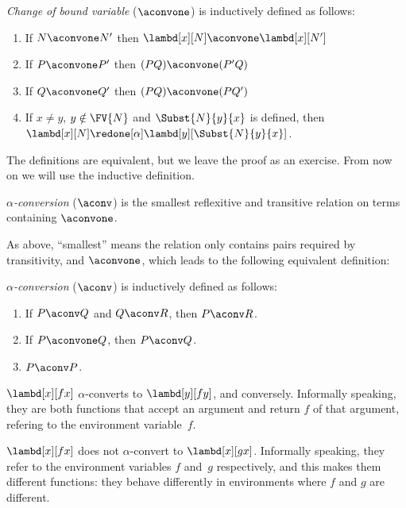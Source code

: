 \documentclass[../../../include/open-logic-section]{subfiles}
\begin{document}
\begin{defn} 
  \emph{Change of bound variable} ($\aconvone$) is inductively
  defined as follows:
  \begin{enumerate}
  \item If $N \aconvone N'$ then $\lambd[x][N] \aconvone
    \lambd[x][N']$ 
  \item If $P \aconvone P'$ then $(PQ) \aconvone (P'Q)$ 
  \item If $Q \aconvone Q'$ then $(PQ) \aconvone (PQ')$ 
  \item If $x \neq y$, $y \notin \FV{N}$ and $\Subst{N}{y}{x}$ is defined, then
    $\lambd[x][N] \redone[\alpha] \lambd[y][\Subst{N}{y}{x}]$.
  \end{enumerate}
\end{defn}

The definitions are equivalent, but we leave the proof as an
exercise. From now on we will use the inductive definition.

\begin{defn}
  \emph{$\alpha$-conversion} ($\aconv$) is the smallest reflexitive
  and transitive relation on terms containing $\aconvone$.
\end{defn}

As above, ``smallest'' means the relation only contains pairs required
by transitivity, and $\aconvone$, which leads to the following
equivalent definition:

\begin{defn} 
  \emph{$\alpha$-conversion} ($\aconv$) is inductively defined as follows:
  \begin{enumerate}
  \item If $P \aconv Q$ and $Q \aconv R$, then $P \aconv R$.
  \item If $P \aconvone Q$, then $P \aconv Q$. 
  \item $P \aconv P$. 
  \end{enumerate}
\end{defn}

\begin{ex}
  $\lambd[x][f x]$ $\alpha$-converts to $\lambd[y][f
  y]$, and conversely. Informally
  speaking, they are both functions that accept an argument and
  return $f$ of that argument, refering to the environment variable~$f$.

  $\lambd[x][f x]$ does not $\alpha$-convert to $\lambd[x][g
    x]$. Informally speaking, they refer to the environment variables
  $f$ and~$g$ respectively, and this makes them different functions: they
  behave differently in environments where $f$ and $g$ are different.
\end{ex}
\end{document}

